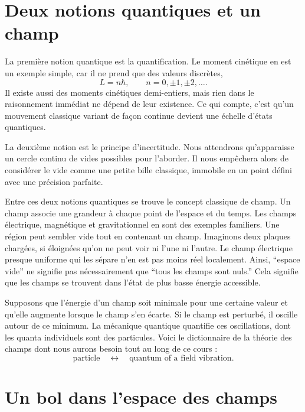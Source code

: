\section{Deux notions quantiques et un champ}

La première notion quantique est la quantification. Le moment cinétique en est un exemple simple, car il ne prend que des valeurs discrètes,
\begin{equation}
L=n\hbar,
\qquad
n=0,\pm1,\pm2,\ldots .
\end{equation}
Il existe aussi des moments cinétiques demi-entiers, mais rien dans le raisonnement immédiat ne dépend de leur existence. Ce qui compte, c’est qu’un mouvement classique variant de façon continue devient une échelle d’états quantiques.

La deuxième notion est le principe d’incertitude. Nous attendrons qu’apparaisse un cercle continu de vides possibles pour l’aborder. Il nous empêchera alors de considérer le vide comme une petite bille classique, immobile en un point défini avec une précision parfaite.

Entre ces deux notions quantiques se trouve le concept classique de champ. Un champ associe une grandeur à chaque point de l’espace et du temps. Les champs électrique, magnétique et gravitationnel en sont des exemples familiers. Une région peut sembler vide tout en contenant un champ. Imaginons deux plaques chargées, si éloignées qu’on ne peut voir ni l’une ni l’autre. Le champ électrique presque uniforme qui les sépare n’en est pas moins réel localement. Ainsi, ``espace vide'' ne signifie pas nécessairement que ``tous les champs sont nuls.'' Cela signifie que les champs se trouvent dans l’état de plus basse énergie accessible.

Supposons que l’énergie d’un champ soit minimale pour une certaine valeur et qu’elle augmente lorsque le champ s’en écarte. Si le champ est perturbé, il oscille autour de ce minimum. La mécanique quantique quantifie ces oscillations, dont les quanta individuels sont des particules. Voici le dictionnaire de la théorie des champs dont nous aurons besoin tout au long de ce cours :
\begin{equation}
\text{particle}
\quad\longleftrightarrow\quad
\text{quantum of a field vibration}.
\end{equation}

\section{Un bol dans l’espace des champs}

